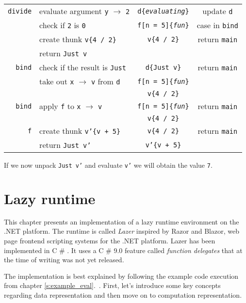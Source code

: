 \documentclass[en]{pracamgr}
\newcommand{\shrp}{%
  {\fontfamily{ppl}\selectfont\#%
  }}
\newcommand{\myref}[1]{\ref{#1}.~\textit{\nameref{#1}}}
\begin{document}
\begin{center}
\begin{tabular}{r | l | c | c }
    \hline
    \texttt{divide} & evaluate argument \texttt{y} $\rightarrow$ \texttt{2} & \texttt{d\{\textit{evaluating}\}} & update \texttt{d} \\
    & check if \texttt{2} is \texttt{0} & \texttt{f[n = 5]\{\textit{fun}\}} & case in \texttt{bind} \\
    & create thunk \texttt{v\{4 / 2\}}& \texttt{v\{4 / 2\}} & return \texttt{main} \\
    & return \texttt{Just v} & & \\
    \hline
    \texttt{bind} & check if the result is \texttt{Just} & \texttt{d\{Just v\}} & return \texttt{main} \\
    & take out \texttt{x} $\rightarrow$ \texttt{v} from \texttt{d} & \texttt{f[n = 5]\{\textit{fun}\}} & \\
    & & \texttt{v\{4 / 2\}} & \\
    \hline
    \texttt{bind} & apply \texttt{f} to \texttt{x} $\rightarrow$ \texttt{v} & \texttt{f[n = 5]\{\textit{fun}\}} & return \texttt{main} \\
    & & \texttt{v\{4 / 2\}} & \\
    \hline
    \texttt{f} & create thunk \texttt{v'\{v + 5\}} & \texttt{v\{4 / 2\}} & return \texttt{main} \\
    & return \texttt{Just v'}& \texttt{v'\{v + 5\}} & \\
    \hline
\end{tabular}
\end{center}

If we now unpack \texttt{Just v'} and evaluate \texttt{v'} we will obtain the value \texttt{7}.


\chapter{Lazy runtime}\label{r:runtime}

This chapter presents an implementation of a lazy runtime environment
on the .NET platform.
The runtime is called \textit{Lazer} inspired by Razor and Blazor,
web page frontend scripting systems for the .NET platform.
Lazer has been implemented in C\shrp{}.
It uses a C\shrp{} 9.0 feature called \textit{function delegates}
that at the time of writing was not yet released.

The implementation is best explained by following the example code execution
from chapter \myref{s:example_eval}.
First, let's introduce some key concepts regarding data representation
and then move on to computation representation.
\end{document}
